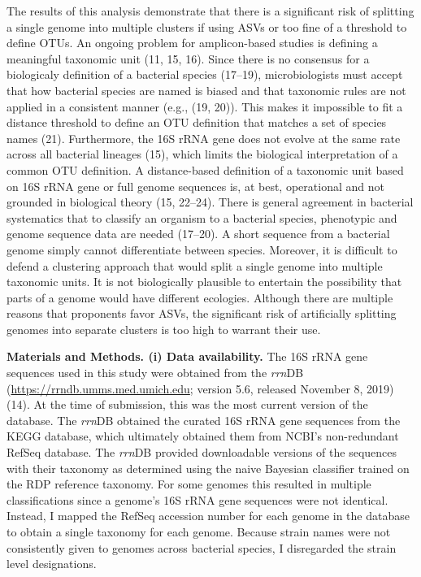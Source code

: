 \documentclass[
]{article}
\begin{document}
The results of this analysis demonstrate that there is a significant
risk of splitting a single genome into multiple clusters if using ASVs
or too fine of a threshold to define OTUs. An ongoing problem for
amplicon-based studies is defining a meaningful taxonomic unit (11, 15,
16). Since there is no consensus for a biologicaly definition of a
bacterial species (17--19), microbiologists must accept that how
bacterial species are named is biased and that taxonomic rules are not
applied in a consistent manner (e.g., (19, 20)). This makes it
impossible to fit a distance threshold to define an OTU definition that
matches a set of species names (21). Furthermore, the 16S rRNA gene does
not evolve at the same rate across all bacterial lineages (15), which
limits the biological interpretation of a common OTU definition. A
distance-based definition of a taxonomic unit based on 16S rRNA gene or
full genome sequences is, at best, operational and not grounded in
biological theory (15, 22--24). There is general agreement in bacterial
systematics that to classify an organism to a bacterial species,
phenotypic and genome sequence data are needed (17--20). A short
sequence from a bacterial genome simply cannot differentiate between
species. Moreover, it is difficult to defend a clustering approach that
would split a single genome into multiple taxonomic units. It is not
biologically plausible to entertain the possibility that parts of a
genome would have different ecologies. Although there are multiple
reasons that proponents favor ASVs, the significant risk of artificially
splitting genomes into separate clusters is too high to warrant their
use.

\vspace{20mm}

\textbf{Materials and Methods. (i) Data availability.} The 16S rRNA gene
sequences used in this study were obtained from the \emph{rrn}DB
(\url{https://rrndb.umms.med.umich.edu}; version 5.6, released November
8, 2019) (14). At the time of submission, this was the most current
version of the database. The \emph{rrn}DB obtained the curated 16S rRNA
gene sequences from the KEGG database, which ultimately obtained them
from NCBI's non-redundant RefSeq database. The \emph{rrn}DB provided
downloadable versions of the sequences with their taxonomy as determined
using the naive Bayesian classifier trained on the RDP reference
taxonomy. For some genomes this resulted in multiple classifications
since a genome's 16S rRNA gene sequences were not identical. Instead, I
mapped the RefSeq accession number for each genome in the database to
obtain a single taxonomy for each genome. Because strain names were not
consistently given to genomes across bacterial species, I disregarded
the strain level designations.
\end{document}
